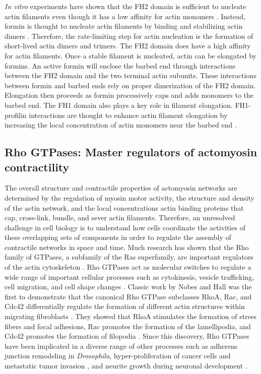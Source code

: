 \documentclass{ucetd}
\begin{document}
\textit{In vitro} experiments have shown that the FH2 domain is sufficient to nucleate actin filaments even though it has a low affinity for actin monomers  \cite{Pring:2003dw,Sagot:2002is}.  Instead, formin is thought to nucleate actin filaments by binding and stabilizing actin dimers \cite{Pring:2003dw}.  Therefore, the rate-limiting step for actin nucleation is the formation of short-lived actin dimers and trimers.  The FH2 domain does have a high affinity for actin filaments.  Once a stable filament is nucleated, actin can be elongated by formins.  An active formin will enclose the barbed end through interactions between the FH2 domain and the two terminal actin subunits.  These interactions between formin and barbed ends rely on proper dimerization of the FH2 domain.  Elongation then proceeds as formin processively caps and adds monomers to the barbed end.  The FH1 domain also plays a key role in filament elongation.  FH1-profilin interactions are thought to enhance actin filament elongation by increasing the local concentration of actin monomers near the barbed end \cite{Kovar:2006fm, Vavylonis:2006im, Paul:2008kv}.


\subsection{Rho GTPases: Master regulators of actomyosin contractility}
The overall structure and contractile properties of actomyosin networks are determined by the regulation of myosin motor activity, the structure and density of the actin network, and the local concentrations actin binding proteins that cap, cross-link, bundle, and sever actin filaments.  Therefore, an unresolved challenge in cell biology is to understand how cells coordinate the activities of these overlapping sets of components in order to regulate the assembly of contractile networks in space and time.  Much research has shown that the Rho family of GTPases, a subfamily of the Ras superfamily, are important regulators of the actin cytoskeleton \cite{Hall:2012cg}.  Rho GTPases act as molecular switches to regulate a wide range of important cellular processes such as cytokinesis, vesicle trafficking, cell migration, and cell shape changes \cite{Piekny:2005dw,Symons:2003vy,Ridley:2001wu, EtienneManneville:2002fq}.  Classic work by Nobes and Hall was the first to demonstrate that the canonical Rho GTPase subclasses RhoA, Rac, and Cdc42 differentially regulate the formation of different actin structures within migrating fibroblasts \cite{Nobes:1995wn}.  They showed that RhoA stimulates the formation of stress fibers and focal adhesions, Rac promotes the formation of the lamellipodia, and Cdc42 promotes the formation of filopodia \cite{Nobes:1995wn}.  Since this discovery, Rho GTPases have been implicated in a diverse range of other processes such as adherens junction remodeling in \textit{Drosophila}, hyper-proliferation of cancer cells and metastatic tumor invasion \cite{Sahai:2002el}, and neurite growth during neuronal development \cite{Stankiewicz:2014bz}.
\end{document}
